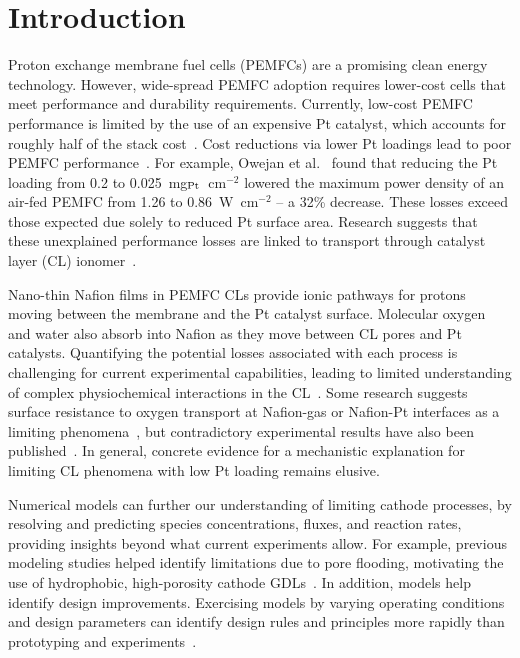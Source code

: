 \documentclass[final,3p,times,twocolumn]{elsarticle}    %
\begin{document}
\section{Introduction}

Proton exchange membrane fuel cells (PEMFCs) are a promising clean energy technology. However, wide-spread PEMFC adoption requires lower-cost cells that meet performance and durability requirements. Currently, low-cost PEMFC performance is limited by the use of an expensive Pt catalyst, which accounts for roughly half of the stack cost~\cite{bib:kongkanand_2016, bib:xie_2021}. Cost reductions via lower Pt loadings lead to poor PEMFC performance~\cite{bib:sakai_2009, bib:ohma_2011, bib:leimin_2009, bib:harzer_2018, bib:banham_2021}. For example, Owejan et al.~\cite{bib:owejan_2013} found that reducing the Pt loading from 0.2 to 0.025~mg$_{\rm Pt}$~cm$^{-2}$ lowered the maximum power density of an air-fed PEMFC from 1.26 to 0.86~W~cm$^{-2}$ -- a 32\% decrease. These losses exceed those expected due solely to reduced Pt surface area. Research suggests that these unexplained performance losses are linked to transport through catalyst layer (CL) ionomer~\cite{bib:paul_2011, bib:paul_2014, bib:weber_2014, bib:modestino_2013, bib:jung_2013}.

Nano-thin Nafion films in PEMFC CLs provide ionic pathways for protons moving between the membrane and the Pt catalyst surface. Molecular oxygen and water also absorb into Nafion as they move between CL pores and Pt catalysts. Quantifying the potential losses associated with each process is challenging for current experimental capabilities, leading to limited understanding of complex physiochemical interactions in the CL~\cite{bib:weber_2014, bib:modestino_2013, bib:jung_2013}. Some research suggests surface resistance to oxygen transport at Nafion-gas or Nafion-Pt interfaces as a limiting phenomena~\cite{bib:weber_kusoglu_2014, bib:nonoyama_2011, bib:kongkanand_2016}, but contradictory experimental results have also been published~\cite{bib:liu_2015}. In general, concrete evidence for a mechanistic explanation for limiting CL phenomena with low Pt loading remains elusive.

Numerical models can further our understanding of limiting cathode processes, by resolving and predicting species concentrations, fluxes, and reaction rates, providing insights beyond what current experiments allow. For example, previous modeling studies helped identify limitations due to pore flooding, motivating the use of hydrophobic, high-porosity cathode GDLs~\cite{bib:chu_2003, bib:abdollahzadeh_2014, bib:weber_darling_2004}. In addition, models help identify design improvements. Exercising models by varying operating conditions and design parameters can identify design rules and principles more rapidly than prototyping and experiments~\cite{bib:weber_2014, bib:arif_2020}. 
\end{document}
